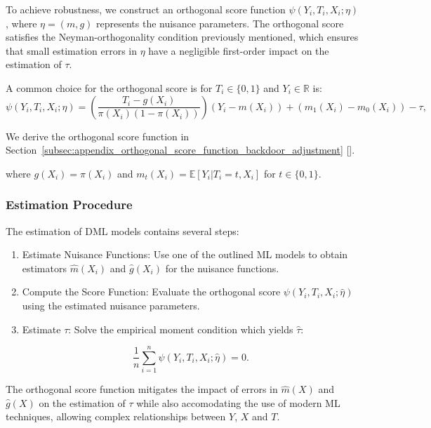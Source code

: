 \documentclass{article}
\numberwithin{equation}{section}
\begin{document}
To achieve robustness, we construct an orthogonal score function $\psi(Y_i, T_i, X_i; \eta)$, where $\eta = (m, g)$ represents the nuisance parameters. The orthogonal score satisfies the Neyman-orthogonality condition previously mentioned, which ensures that small estimation errors in $\eta$ have a negligible first-order impact on the estimation of $\tau$.

A common choice for the orthogonal score is for $T_i \in \{0,1\}$ and $Y_i \in \mathbb{R}$ is:
\begin{equation}
\psi(Y_i, T_i, X_i; \eta) = \left( \frac{T_i - g(X_i)}{\pi(X_i)(1 - \pi(X_i))} \right) (Y_i - m(X_i)) + \left( m_1(X_i) - m_0(X_i) \right) - \tau,
\label{eq:orthogonal_score}
\end{equation}

We derive the orthogonal score function in Section~\ref{subsec:appendix_orthogonal_score_function_backdoor_adjustment} [\cite{ChernozhukovChetverikovDemireretal2018}].

where $g(X_i) = \pi(X_i)$ and $m_t(X_i) = \mathbb{E}[Y_i | T_i = t, X_i]$ for $t \in \{0,1\}$.

\subsubsection{Estimation Procedure}

The estimation of DML models contains several steps:
\begin{enumerate}[label=\roman*.]
\item Estimate Nuisance Functions: Use one of the outlined ML models to obtain estimators $\hat{m}(X_i)$ and $\hat{g}(X_i)$ for the nuisance functions.

\item Compute the Score Function: Evaluate the orthogonal score $\psi(Y_i, T_i, X_i; \hat{\eta})$ using the estimated nuisance parameters.

\item Estimate $\tau$: Solve the empirical moment condition which yields $\hat{\tau}$:

\begin{equation}
\frac{1}{n} \sum_{i=1}^n \psi(Y_i, T_i, X_i; \hat{\eta}) = 0.
\label{eq:orthogonal_score_psi}
\end{equation}
\end{enumerate}

The orthogonal score function mitigates the impact of errors in $\hat{m}(X)$ and $\hat{g}(X)$ on the estimation of $\tau$ while also accomodating the use of modern ML techniques, allowing complex relationships between $Y$, $X$ and $T$.
\end{document}
